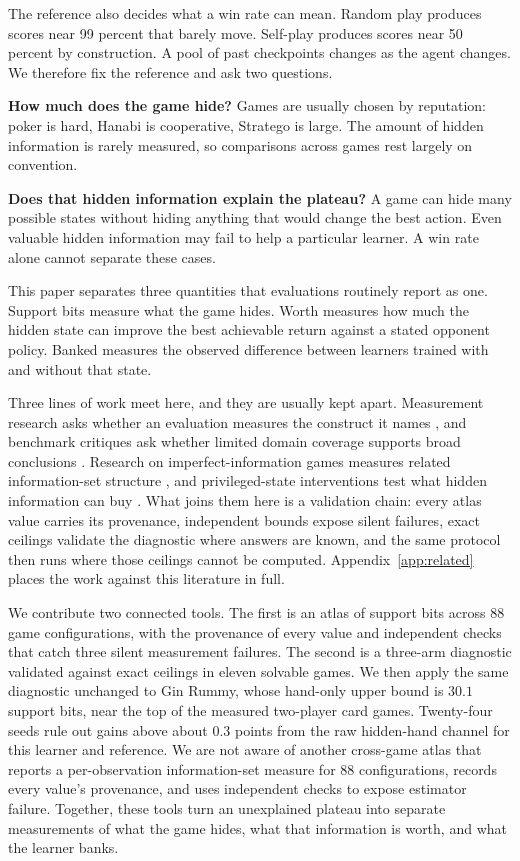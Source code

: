 \documentclass{article}
\begin{document}
The reference also decides what a win rate can mean. Random play produces scores near 99 percent that barely move. Self-play produces scores near 50 percent by construction. A pool of past checkpoints changes as the agent changes. We therefore fix the reference and ask two questions.

\textbf{How much does the game hide?} Games are usually chosen by reputation: poker is hard, Hanabi is cooperative, Stratego is large. The amount of hidden information is rarely measured, so comparisons across games rest largely on convention.

\textbf{Does that hidden information explain the plateau?} A game can hide many possible states without hiding anything that would change the best action. Even valuable hidden information may fail to help a particular learner. A win rate alone cannot separate these cases.

This paper separates three quantities that evaluations routinely report as one. Support bits measure what the game hides. Worth measures how much the hidden state can improve the best achievable return against a stated opponent policy. Banked measures the observed difference between learners trained with and without that state.

\label{sec:related}
Three lines of work meet here, and they are usually kept apart. Measurement research asks whether an evaluation measures the construct it names \citep{measurementfairness}, and benchmark critiques ask whether limited domain coverage supports broad conclusions \citep{wholeworld}. Research on imperfect-information games measures related information-set structure \citep{pimc,rbccomplexity,ggpii}, and privileged-state interventions test what hidden information can buy \citep{policyinference,ismcts}. What joins them here is a validation chain: every atlas value carries its provenance, independent bounds expose silent failures, exact ceilings validate the diagnostic where answers are known, and the same protocol then runs where those ceilings cannot be computed. Appendix~\ref{app:related} places the work against this literature in full.

We contribute two connected tools. The first is an atlas of support bits across 88 game configurations, with the provenance of every value and independent checks that catch three silent measurement failures. The second is a three-arm diagnostic validated against exact ceilings in eleven solvable games. We then apply the same diagnostic unchanged to Gin Rummy, whose hand-only upper bound is $30.1$ support bits, near the top of the measured two-player card games. Twenty-four seeds rule out gains above about $0.3$ points from the raw hidden-hand channel for this learner and reference. We are not aware of another cross-game atlas that reports a per-observation information-set measure for 88 configurations, records every value's provenance, and uses independent checks to expose estimator failure. Together, these tools turn an unexplained plateau into separate measurements of what the game hides, what that information is worth, and what the learner banks.
\end{document}
